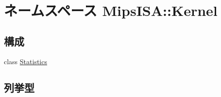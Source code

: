\hypertarget{namespaceMipsISA_1_1Kernel}{
\section{ネームスペース MipsISA::Kernel}
\label{namespaceMipsISA_1_1Kernel}
}
\subsection*{構成}
\begin{DoxyCompactItemize}
\item 
class \hyperlink{classMipsISA_1_1Kernel_1_1Statistics}{Statistics}
\end{DoxyCompactItemize}
\subsection*{列挙型}
